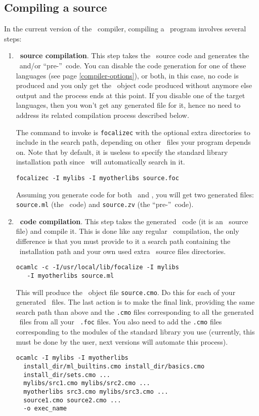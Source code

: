 \subsection{Compiling a source}
In the current version of the \focal\ compiler, compiling a \focal\
program involves several steps:
\begin{enumerate}
  \item {\bf \focal\ source compilation}. This step takes the \focal\
    source code and generates the \ocaml\ and/or ``pre-''\coq\ code.
    You can disable the code generation for one of these languages
    (see page \ref{compiler-options}), or both, in this case, no code is
    produced and you only get the \focal\ object code produced without
    anymore else output and the process ends at this point. If you
    disable one of the target languages, then you won't get any
    generated file for it, hence no need to address its related
    compilation process described below.

  The command to invoke is {\tt focalizec} with the optional extra
  directories to include in the search path, depending on other
  \focal\ files your program depends on. Note that by default, it is
  useless to specify the standard library installation path since
  \focal\ will automatically search in it.
  \begin{center}
  {\tt focalizec -I mylibs -I myotherlibs source.foc}
  \end{center}
  Assuming you generate code for both \ocaml\ and \coq, you will get
  two generated files: {\tt source.ml} (the \ocaml\ code) and
  {\tt source.zv} (the ``pre-''\coq\ code).

  \item {\bf \ocaml\ code compilation}. This step takes the generated
    \ocaml\ code (it is an \ocaml\ source file) and compile it. This
    is done like any regular \ocaml\ compilation, the only difference
    is that you must provide to it a search path containing the
    \focal\ installation path and your own used extra \focal\ source
    files directories.
    \begin{verbatim}
ocamlc -c -I/usr/local/lib/focalize -I mylibs
   -I myotherlibs source.ml
    \end{verbatim}
    This will produce the \ocaml\ object file {\tt source.cmo}. Do
    this for each of your generated \ocaml\ files. The last action is
    to make the final link, providing the same search path than above
    and the {\tt .cmo} files corresponding to all the generated
    \ocaml\ files from all your \focal\ {\tt .foc} files. You also
    need to add the {\tt .cmo} files corresponding to the modules of
    the standard library you use (currently, this must be done by the
    user, next versions will automate this process).
    \begin{verbatim}
ocamlc -I mylibs -I myotherlibs
  install_dir/ml_builtins.cmo install_dir/basics.cmo
  install_dir/sets.cmo ...
  mylibs/src1.cmo mylibs/src2.cmo ...
  myotherlibs src3.cmo mylibs/src3.cmo ...
  source1.cmo source2.cmo ...
  -o exec_name
    \end{verbatim}


\end{enumerate}
